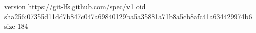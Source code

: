 version https://git-lfs.github.com/spec/v1
oid sha256:07355d11dd7b847c047a69840129ba5a35881a71b8a5cb8afc41a634429974b6
size 184
